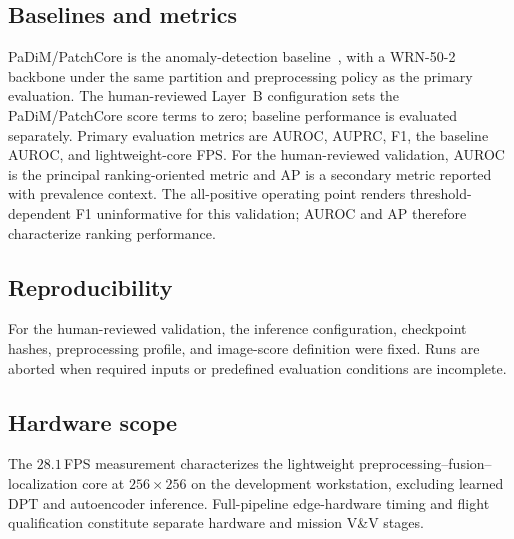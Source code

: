 \subsection{Baselines and metrics}
PaDiM/PatchCore is the anomaly-detection baseline~\citep{defard2020padim,roth2022patchcore},
with a WRN-50-2 backbone under the same partition and preprocessing policy as the primary
evaluation.
The human-reviewed Layer~B configuration sets the PaDiM/PatchCore score terms to zero;
baseline performance is evaluated separately.
Primary evaluation metrics are AUROC, AUPRC, F1, the baseline AUROC, and lightweight-core FPS.
For the human-reviewed validation, AUROC is the principal ranking-oriented metric and AP is a
secondary metric reported with prevalence context.
The all-positive operating point renders threshold-dependent F1 uninformative for this
validation; AUROC and AP therefore characterize ranking performance.

\subsection{Reproducibility}
For the human-reviewed validation, the inference configuration, checkpoint hashes,
preprocessing profile, and image-score definition were fixed.
Runs are aborted when required inputs or predefined evaluation conditions are incomplete.

\subsection{Hardware scope}
The $28.1$\,FPS measurement characterizes the lightweight preprocessing--fusion--localization
core at $256\times256$ on the development workstation, excluding learned DPT and autoencoder
inference.
Full-pipeline edge-hardware timing and flight qualification constitute separate hardware and
mission V\&V stages.

